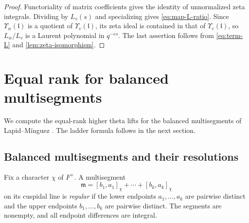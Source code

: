 \documentclass[10pt,a4paper]{article}
\newtheorem{prop}[theorem]{Proposition}
\newtheorem{corollary}[theorem]{Corollary}
\theoremstyle{definition}
\theoremstyle{remark}
\numberwithin{equation}{section}
\newcommand{\Ff}{F}
\newcommand{\fm}{\mathfrak{m}}
\newcommand{\fl}{\mathfrak{l}}
\newcommand{\cZ}{\mathcal{Z}}
\newcommand{\cE}{\mathcal{E}}
\newcommand{\sra}{\twoheadrightarrow}
\begin{document}
\begin{proof}
Functoriality of matrix coefficients gives the identity of unnormalized
zeta integrals. Dividing by $L_v(s)$ and specializing gives
\eqref{eq:map-L-ratio}. Since $\Upsilon_w(\fl)$ is a quotient of $\Upsilon_v(\fl)$,
its zeta ideal is contained in that of $\Upsilon_v(\fl)$, so $L_w/L_v$ is a
Laurent polynomial in $q^{-es}$. The last assertion follows from
\eqref{eq:term-L} and \cref{lem:zeta-isomorphism}.
\end{proof}

\section{Equal rank for balanced multisegments}\label{sec:regular-equal-rank}

We compute the equal-rank higher theta lifts for the balanced
multisegments of Lapid--M\'inguez \cite[\S6]{RegularLM2018}.
The ladder formula follows in the next section.

\subsection{Balanced multisegments and their resolutions}
\label{gl:regular:resolution-subsection}

Fix a character $\chi$ of $\Ff^\times$. A multisegment
\[
 \fm=[b_1,a_1]_\chi+\cdots+[b_k,a_k]_\chi
\]
on its cuspidal line is \emph{regular} if the lower endpoints
$a_1,\ldots,a_k$ are pairwise distinct and the upper endpoints
$b_1,\ldots,b_k$ are pairwise distinct. The segments are nonempty,
and all endpoint differences are integral.
\end{document}
